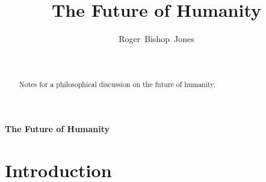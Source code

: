 \documentclass[12pt,titlepage]{article}
\title{The Future of Humanity}
\author{Roger~Bishop~Jones}
\date{\ }
\begin{document}
                               
\begin{titlepage}
\maketitle

\begin{abstract}
Notes for a philosophical discussion on the future of humanity.
\end{abstract}





\end{titlepage}

\setcounter{tocdepth}{2}
{\parskip-0pt\tableofcontents}



\pagebreak

\begin{centering}
{\LARGE \bf The Future of Humanity}
\end{centering}

\section{Introduction}
\end{document}
